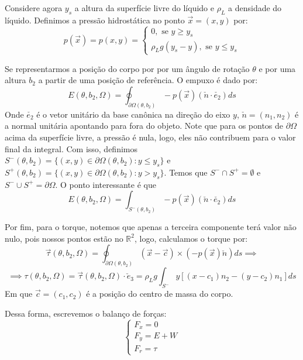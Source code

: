 \documentclass[
	12pt,				%
	oneside,			%
	a4paper,			%
	]{article}
\begin{document}
    Considere agora $y_s$ a altura da superfície livre do líquido e $\rho_L$ a densidade do líquido. Definimos a pressão hidrostática no ponto $\vec{x} = (x,y)$ por:
    \[
        p(\vec{x}) = p(x,y) = \begin{cases}
            0, \text{ se } y \ge y_s \\
            \rho_L g (y_s - y), \text{ se } y \le y_s
        \end{cases}
    \]
     
    Se representarmos a posição do corpo por por um ângulo de rotação $\theta$ e por uma altura $b_2$ a partir de uma posição de referência. O empuxo é dado por:
    \[
        E(\theta, b_2, \Omega) = \oint_{\partial \Omega (\theta, b_2)} -p(\vec{x})(\check{n} \cdot \check{e_2}) ds
    \]
    Onde $\check{e_2}$ é o vetor unitário da base canônica na direção do eixo $y$, $\check{n} = (n_1, n_2)$ é a normal unitária apontando para fora do objeto. Note que para os pontos de $\partial \Omega$ acima da superfície livre, a pressão é nula, logo, eles não contribuem para o valor final da integral. Com isso, definimos $S^-(\theta, b_2) = \{(x,y) \in \partial \Omega (\theta, b_2) : y \le y_s\}$ e $S^+(\theta, b_2) = \{(x,y) \in \partial \Omega (\theta, b_2) : y > y_s \}$. Temos que $S^- \cap S^+ = \emptyset$ e $S^- \cup S^+ = \partial \Omega$. O ponto interessante é que
    \begin{equation}
        E(\theta, b_2, \Omega) = \int_{S^- (\theta, b_2)} -p(\vec{x})(\check{n} \cdot \check{e_2}) ds
        \label{eq:empuxo}
    \end{equation}
    

    Por fim, para o torque, notemos que apenas a terceira componente terá valor não nulo, pois nossos pontos estão no $\mathbb{R}^2$, logo, calculamos o torque por:
    \[
        \vec{\tau}(\theta, b_2, \Omega) = \oint_{\partial \Omega (\theta, b_2)} (\vec{x} - \vec{c}) \times (-p(\vec{x}) \check{n}) ds \implies 
    \]
    \begin{equation}
        \implies \tau(\theta, b_2, \Omega) = \vec{\tau}(\theta, b_2, \Omega) \cdot \check{e}_3 = \rho_L g \int_{S^-} y[(x - c_1)n_2 - (y-c_2)n_1] ds
    \label{eq:torque}
    \end{equation}
    Em que $\vec{c} = (c_1, c_2)$ é a posição do centro de massa do corpo.


    Dessa forma, escrevemos o balanço de forças:
    \begin{equation}
        \label{eq:forças}
        \begin{cases}
            F_x = 0 \\
            F_y = E + W \\
            F_r = \tau
        \end{cases}
    \end{equation}
\end{document}
